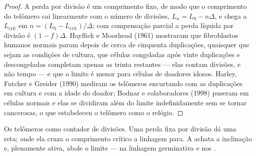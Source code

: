 \begin{proof}
A perda por divisão é um comprimento fixo, de modo que o comprimento do
telômero cai linearmente com o número de divisões, $L_{n} = L_{0} - n\Delta$, e chega a $L_{\text{crit}}$ em $n = (L_{0} - L_{\text{crit}})/\Delta$; com compensação parcial a perda líquida por
divisão é $(1 - f)\Delta$. Hayflick e Moorhead (1961) mostraram que
fibroblastos humanos normais param depois de cerca de cinquenta
duplicações, quaisquer que sejam as condições de cultura, que células
congeladas após vinte duplicações e descongeladas completam apenas as
trinta restantes --- elas contam divisões, e não tempo --- e que o limite
é menor para células de doadores idosos. Harley, Futcher e Greider (1990)
mediram os telômeros encurtando com as duplicações em cultura e com a
idade do doador; Bodnar e colaboradores (1998) puseram  em
células normais e elas se dividiram além do limite indefinidamente sem se
tornar cancerosas, o que estabeleceu o telômero como o relógio.
\end{proof}

\begin{omfigure}

{\small Os telômeros como contador de divisões. Uma perda fixa por
divisão dá uma reta; onde ela cruza o comprimento crítico a linhagem
para. A  achata a inclinação e, plenamente ativa, abole o
limite --- na linhagem germinativa e nos .}
\end{omfigure}

